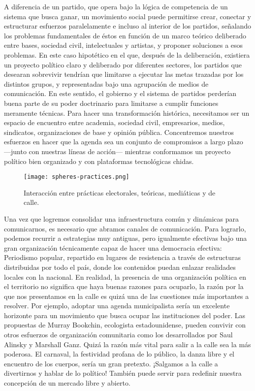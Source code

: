 A diferencia de un partido, que opera bajo la lógica de competencia de un sistema que busca ganar, un movimiento social puede permitirse crear, conectar y estructurar esfuerzos paralelamente e incluso al interior de los partidos, señalando los problemas fundamentales de éstos en función de un marco teórico deliberado entre bases, sociedad civil, intelectuales y artistas, y proponer soluciones a esos problemas. En este caso hipotético en el que, después de la deliberación, existiera un proyecto político claro y deliberado por diferentes sectores, los partidos que desearan sobrevivir tendrían que limitarse a ejecutar las metas trazadas por los distintos grupos, y representadas bajo una agrupación de medios de comunicación. En este sentido, el gobierno y el sistema de partidos perderían buena parte de su poder doctrinario para limitarse a cumplir funciones meramente técnicas. Para hacer una transformación histórica, necesitamos ser un espacio de encuentro entre academia, sociedad civil, empresarios, medios, sindicatos, organizaciones de base y opinión pública. Concentremos nuestros esfuerzos en hacer que la agenda sea un conjunto de compromisos a largo plazo ---junto con nuestras líneas de acción--- mientras conformamos un proyecto político bien organizado y con plataformas tecnológicas chidas.

\begin{figure}[htbp]
	\centering
	\texttt{[image: spheres-practices.png]}
	\caption{Interacción entre prácticas electorales, teóricas, mediáticas y de calle.}
	\label{fig:interacciones}
\end{figure}

Una vez que logremos consolidar una infraestructura común y dinámicas para comunicarnos, es necesario que abramos canales de comunicación. Para lograrlo, podemos recurrir a estrategias muy antiguas, pero igualmente efectivas bajo una gran organización técnicamente capaz de hacer una democracia efectiva: Periodismo popular, repartido en lugares de resistencia a través de estructuras distribuidas por todo el país, donde los contenidos puedan enlazar realidades locales con la nacional. En realidad, la presencia de una organización política en el territorio no significa que haya buenas razones para ocuparlo, la razón por la que nos presentamos en la calle es quizá una de las cuestiones más importantes a resolver. Por ejemplo, adoptar una agenda municipalista sería un excelente horizonte para un movimiento que busca ocupar las instituciones del poder. Las propuestas de Murray Bookchin, ecologista estadounidense, pueden convivir con otros esfuerzos de organización comunitaria como los desarrollados por Saul Alinsky y Marshall Ganz. Quizá la razón más vital para salir a la calle sea la más poderosa. El carnaval, la festividad profana de lo público, la danza libre y el encuentro de los cuerpos, sería un gran pretexto. ¡Salgamos a la calle a divertirnos y hablar de lo político! También puede servir para redefinir nuestra concepción de un mercado libre y abierto.

